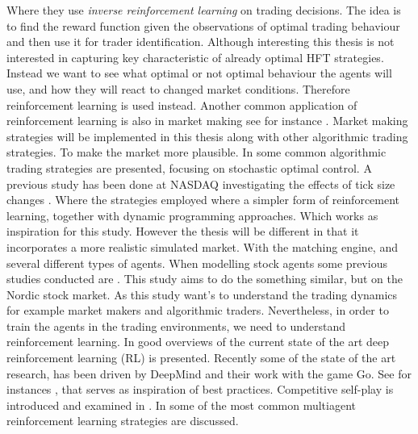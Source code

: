 \documentclass{kththesis}
\theoremstyle{definition}
\begin{document}
\newline
\newline
Where they use \textit{inverse reinforcement learning} on trading decisions. The idea is to find the reward function given the observations of optimal trading behaviour and then use it for trader identification. 
Although interesting this thesis is not interested in capturing key characteristic of already optimal HFT strategies. Instead we want to see what optimal or not optimal behaviour the agents will use, and how they will react to changed market conditions. Therefore reinforcement learning is used instead. Another common application of reinforcement learning is also in market making see for instance \parencite{jumadinova2010comparison,chan2001electronic, fernandez2015high, sherstov2004three}. Market making strategies will be implemented in this thesis along with other algorithmic trading strategies. To make the market more plausible. 
\newline
\newline
In \textcite{cartea2015algorithmic} some common algorithmic trading strategies are presented, focusing on stochastic optimal control.
A previous study has been done at NASDAQ investigating the effects of tick size changes \textcite{darley2007nasdaq}. Where the strategies employed where a simpler form of reinforcement learning, together with dynamic programming approaches. Which works as inspiration for this study. However the thesis will be different in that it incorporates a more realistic simulated market. With the matching engine, and several different types of agents. When modelling stock agents some previous studies conducted are \parencite{pastore2015modelling, rutkauskas2009building}. This study aims to do the something similar, but on the Nordic stock market. As this study want's to understand the trading dynamics for example market makers and algorithmic traders. 
\newline
\newline
Nevertheless, in order to train the agents in the trading environments, we need to understand reinforcement learning. In \parencite{arulkumaran2017brief, mnih2015human, li2017deep} good overviews of the current state of the art deep reinforcement learning (RL) is presented.  Recently some of the state of the art research, has been driven by DeepMind and their work with the game Go. See for instances \parencite{silver2016mastering, silver2017mastering, vinyals2017starcraft}, that serves as inspiration of best practices. Competitive self-play is introduced and examined in \parencite{bansal2017emergent, schulman2017proximal}. In \parencite{busoniu2008comprehensive, bucsoniu2010multi} some of the most common multiagent reinforcement learning strategies are discussed. 
\end{document}
